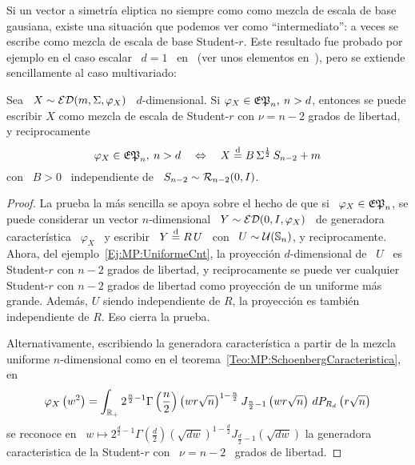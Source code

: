 Si un vector a simetr\'ia eliptica no siempre como como mezcla de escala de base
gausiana, existe una situaci\'on que  podemos ver como ``intermediato'': a veces
se  escribe como  mezcla  de escala  de  base Student-$r$.   Este resultado  fue
probado  por  ejemplo  en el  caso  escalar  \  $d=1$ \  en~\cite{Wil56,  Kem71,
  KeiSte74} (ver unos elementos en~\cite{Dan51}), pero se extiende sencillamente
al caso multivariado:
%
\begin{teorema}
\label{Teo:MP:MezclaStudentRCaracteristica}
%
  Sea \  $X \sim \mathcal{ED}(m,\Sigma,\varphi_X)$  \ $d$-dimensional. Si  $\varphi_X \in
  \mathfrak{EP}_n, \: n  > d$, entonces se  puede escribir $X$ como mezcla  de escala de
  Student-$r$ con $\nu = n-2$ grados de libertad, y reciprocamente
  \[
  \varphi_X \in  \mathfrak{EP}_n, \:  n > d  \quad \Leftrightarrow  \quad X \stackrel{\mathrm{d}}{=}  B \,
  \Sigma^{\frac12} \, S_{n-2} + m
  \]
  con \ $B > 0$ \ independiente de \ $S_{n-2} \sim \mathcal{R}_{n-2}(0,I)$.
\end{teorema}
%
\begin{proof}
  La prueba la m\'as sencilla se apoya sobre el hecho de que si \ $\varphi_X \in
  \mathfrak{EP}_n$,   se  puede  considerar   un  vector   $n$-dimensional  \   $Y  \sim
  \mathcal{ED}(0,I,\varphi_X)$  \  de  generadora  caracter\'istica  \  $\varphi_X$  \  y
  escribir \ $Y \stackrel{\mathrm{d}}{=}  R \, U$ \ con \ $U  \sim \mathcal{U}(\mathbb{S}_n)$, y reciprocamente.
  Ahora, del ejemplo~\ref{Ej:MP:UniformeCnt}, la proyecci\'on $d$-dimensional de
  \ $U$ \ es Student-$r$ con $n-2$ grados de libertad, y reciprocamente se puede
  ver cualquier Student-$r$ con $n-2$ grados de libertad como proyecci\'on de un
  uniforme  m\'as  grande.   Adem\'as,  $U$  siendo  independiente  de  $R$,  la
  proyecci\'on es tambi\'en independiente de $R$. Eso cierra la prueba.

  Alternativamente, escribiendo  la generadora  caracter\'istica a partir  de la
  mezcla        uniforme         $n$-dimensional        como        en        el
  teorema~\ref{Teo:MP:SchoenbergCaracteristica}, en
  \[
  \varphi_X\left(  w^2 \right)  = \int_{\mathbb{R}_+}  2^{\frac{n}{2}-1} \Gamma\left(
    \frac{n}{2}   \right)   \left(    w   r   \sqrt{n}   \right)^{1-\frac{n}{2}}
  J_{\frac{n}{2}-1}\left(  w r  \sqrt{n}  \right) \,  dP_{R_d}\left( r  \sqrt{n}
  \right)
  \]
  se  reconoce  en \  $  w  \mapsto  2^{\frac{d}{2}-1} \Gamma\left(  \frac{d}{2}
  \right)  \left(  \sqrt{d  w}  \right)^{1-\frac{d}{2}}  J_{\frac{d}{2}-1}\left(
    \sqrt{d w}  \right)$ la  generadora caracteristica de  la Student-$r$  con \
  $\nu = n-2$ \ grados de libertad.
\end{proof}

